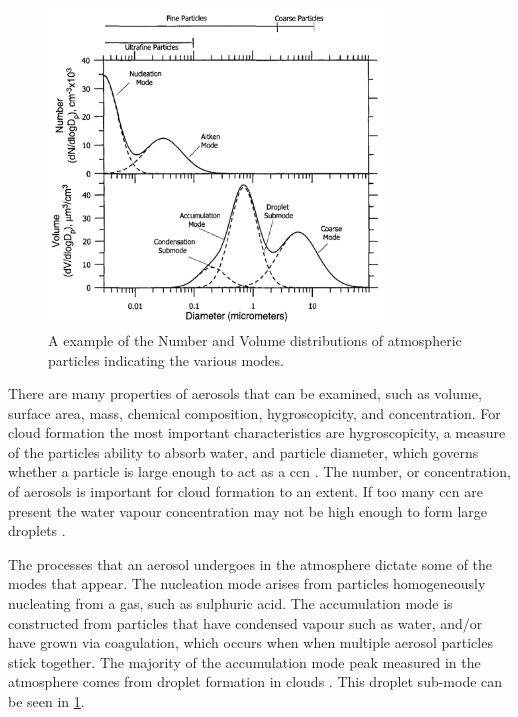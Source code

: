 	\begin{figure}[!htb]
	 	\centering
	 	\includegraphics[width=0.8\textwidth,natwidth=1302,natheight=1222]{Fig/aerosolmodes.png}
	 	\caption{A example of the Number and Volume distributions of atmospheric particles indicating the various modes. \citep[Chapter 8]{seinfeld2012atmospheric}}
	 	\label{fig:aermode}
	\end{figure}

	There are many properties of aerosols that can be examined, such as volume, surface area, mass, chemical composition, hygroscopicity, and concentration. For cloud formation the most important characteristics are hygroscopicity, a measure of the particles ability to absorb water, and particle diameter, which governs whether a particle is large enough to act as a \gls{ccn} \citep[Chapter 6]{rogers1989short}. The number, or concentration, of aerosols is important for cloud formation to an extent. If too many \gls{ccn} are present the water vapour concentration may not be high enough to form large droplets \citep[Chapter 22]{seinfeld2012atmospheric}.

	The processes that an aerosol undergoes in the atmosphere dictate some of the modes that appear. The nucleation mode arises from particles homogeneously nucleating from a gas, such as sulphuric acid. The accumulation mode is constructed from particles that have condensed vapour such as water, and/or have grown via coagulation, which occurs when when multiple aerosol particles stick together. The majority of the accumulation mode peak measured in the atmosphere comes from droplet formation in clouds \citep[Chapter 8]{seinfeld2012atmospheric}. This droplet sub-mode can be seen in \cref{fig:aermode}.

